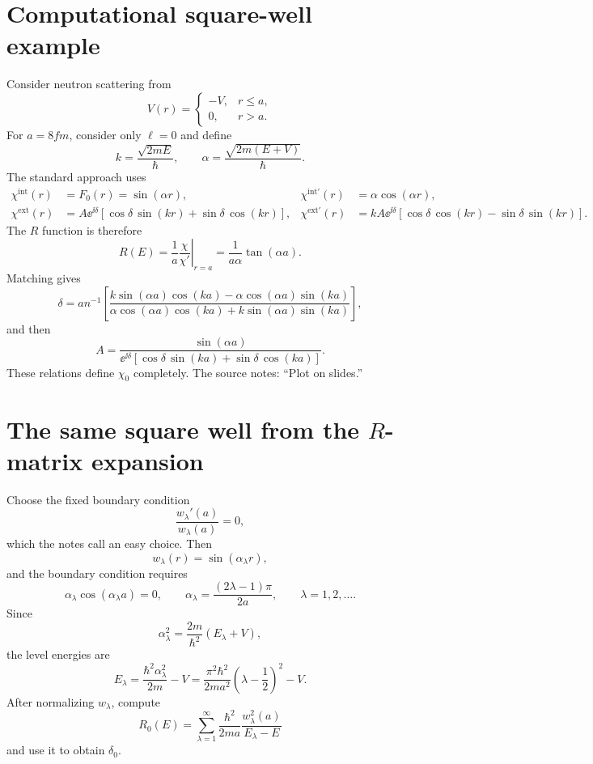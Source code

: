 \section{Computational square-well example}
Consider neutron scattering from
\[
  V(r)=
  \begin{cases}
    -V, & r\le a,\\
    0, & r>a.
  \end{cases}
\]
For $a=8\unit{fm}$, consider only $\ell=0$ and define
\[
  k=\frac{\sqrt{2mE}}{\hbar},
  \qquad
  \alpha=\frac{\sqrt{2m(E+V)}}{\hbar}.
\]
The standard approach uses
\begin{align*}
  \chi^{\mathrm{int}}(r)&=F_0(r)=\sin(\alpha r),
  &\chi^{\mathrm{int}\prime}(r)&=\alpha\cos(\alpha r),\\
  \chi^{\mathrm{ext}}(r)&=
  A\ee^{\ii\delta}
  \left[\cos\delta\,\sin(kr)+\sin\delta\,\cos(kr)\right],
  &\chi^{\mathrm{ext}\prime}(r)&=
  kA\ee^{\ii\delta}
  \left[\cos\delta\,\cos(kr)-\sin\delta\,\sin(kr)\right].
\end{align*}
The $R$ function is therefore
\begin{equation}
  R(E)=\left.\frac{1}{a}\frac{\chi}{\chi'}\right|_{r=a}
  =\frac{1}{a\alpha}\tan(\alpha a).
  \label{eq:rmat-square-well-R}
\end{equation}
Matching gives
\begin{equation}
  \delta=	an^{-1}\!\left[
    \frac{k\sin(\alpha a)\cos(ka)
      -\alpha\cos(\alpha a)\sin(ka)}
    {\alpha\cos(\alpha a)\cos(ka)
      +k\sin(\alpha a)\sin(ka)}
  \right],
  \label{eq:rmat-square-well-delta}
\end{equation}
and then
\begin{equation}
  A=
  \frac{\sin(\alpha a)}
  {\ee^{\ii\delta}
   [\cos\delta\,\sin(ka)+\sin\delta\,\cos(ka)]}.
  \label{eq:rmat-square-well-amplitude}
\end{equation}
These relations define $\chi_0$ completely.  The source notes: ``Plot on slides.''

\section{The same square well from the \texorpdfstring{$R$}{R}-matrix expansion}
Choose the fixed boundary condition
\[
  \frac{w_\lambda'(a)}{w_\lambda(a)}=0,
\]
which the notes call an easy choice.  Then
\[
  w_\lambda(r)=\sin(\alpha_\lambda r),
\]
and the boundary condition requires
\[
  \alpha_\lambda\cos(\alpha_\lambda a)=0,
  \qquad
  \alpha_\lambda=\frac{(2\lambda-1)\pi}{2a},
  \qquad \lambda=1,2,\ldots.
\]
Since
\[
  \alpha_\lambda^2=\frac{2m}{\hbar^2}(E_\lambda+V),
\]
the level energies are
\begin{equation}
  E_\lambda
  =\frac{\hbar^2\alpha_\lambda^2}{2m}-V
  =\frac{\pi^2\hbar^2}{2ma^2}
   \left(\lambda-\frac12\right)^2-V.
  \label{eq:rmat-square-well-levels}
\end{equation}
After normalizing $w_\lambda$, compute
\begin{equation}
  R_0(E)=\sum_{\lambda=1}^{\infty}
  \frac{\hbar^2}{2ma}
  \frac{w_\lambda^2(a)}{E_\lambda-E}
  \label{eq:rmat-square-well-series}
\end{equation}
and use it to obtain $\delta_0$.

